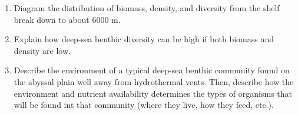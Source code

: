 \documentclass[nofonts, letterpaper]{tufte-handout}
\begin{document}
\begin{enumerate}
\item
  Diagram the distribution of biomass, density, and diversity from the 
  shelf break down to about 6000 m.
 
\item
  Explain how deep-sea benthic diversity can be high if both biomass and 
  density are low.

\item
  Describe the environment of a typical deep-sea benthic community 
  found on the abyssal plain well away from hydrothermal vents. Then,
  describe how the environment and nutrient availability determines the types
  of organisms that will be found int that community (where they live, how they feed, etc.).

\end{enumerate}
\end{document}
